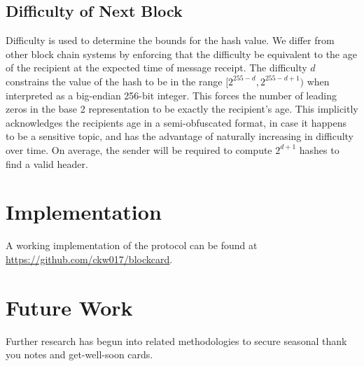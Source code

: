 \documentclass[
parskip=half
]{article}
\begin{document}
\subsection{Difficulty of Next Block}
Difficulty is used to determine the bounds for the hash value. We differ from other block chain systems by enforcing that the difficulty be equivalent to the age of the recipient at the expected time of message receipt. The difficulty $d$ constrains the value of the hash to be in the range $[2^{255 - d}, 2^{255 - d + 1})$ when interpreted as a big-endian 256-bit integer. This forces the number of leading zeros in the base 2 representation to be exactly the recipient's age. This implicitly acknowledges the recipients age in a semi-obfuscated format, in case it happens to be a sensitive topic, and has the advantage of naturally increasing in difficulty over time. On average, the sender will be required to compute $2^{d+1}$ hashes to find a valid header.

\section{Implementation}
 A working implementation of the protocol can be found at \href{https://github.com/ckw017/blockcard}{\underline{https://github.com/ckw017/blockcard}}.

\section{Future Work}
 Further research has begun into related methodologies to secure seasonal thank you notes and get-well-soon cards.

 

 
\end{document}
